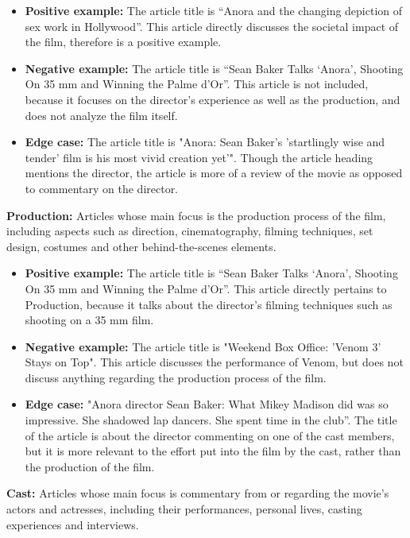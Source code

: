 \documentclass[letterpaper]{article} %
\begin{document}
\begin{itemize}
\item \textbf{Positive example:} The article title is “Anora and the changing depiction of sex work in Hollywood”. This article directly discusses the societal impact of the film, therefore is a positive example.

\item\textbf{Negative example:} The article title is “Sean Baker Talks ‘Anora’, Shooting On 35 mm and Winning the Palme d’Or”. This article is not included, because it focuses on the director’s experience as well as the production, and does not analyze the film itself.

\item\textbf{Edge case:} The article title is "Anora: Sean Baker's 'startlingly wise and tender' film is his most vivid creation yet'". Though the article heading mentions the director, the article is more of a review of the movie as opposed to commentary on the director.
\end{itemize}
\textbf{Production:} Articles whose main focus is the production process of the film, including aspects such as direction, cinematography, filming techniques, set design, costumes and other behind-the-scenes elements.
\begin{itemize}
\item\textbf{Positive example:} The article title is “Sean Baker Talks ‘Anora’, Shooting On 35 mm and Winning the Palme d’Or”. This article directly pertains to Production, because it talks about the director’s filming techniques such as shooting on a 35 mm film.
\item\textbf{Negative example:} The article title is "Weekend Box Office: 'Venom 3' Stays on Top". This article discusses the performance of Venom, but does not discuss anything regarding the production process of the film.
\item\textbf{Edge case:} "Anora director Sean Baker: What Mikey Madison did was so impressive. She shadowed lap dancers. She spent time in the club”. The title of the article is about the director commenting on one of the cast members, but it is more relevant to the effort put into the film by the cast, rather than the production of the film.
\end{itemize}
\textbf{Cast:} Articles whose main focus is commentary from or regarding the movie’s actors and actresses, including their performances, personal lives, casting experiences and interviews. 
\end{document}
